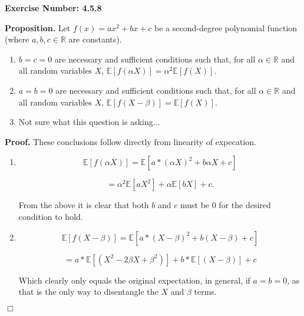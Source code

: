\documentclass{article}
\begin{document}
\noindent \textbf{Exercise Number: 4.5.8}  %

\medskip 

\noindent \textbf{Proposition.} Let $f(x) = ax^2 + bx + c$ be a second-degree polynomial function (where $a,b,c \in \mathbb{R}$ are constants). 

\begin{enumerate}

\item $b = c = 0$ are necessary and sufficient conditions such that, for all $\alpha \in \mathbb{R}$ and all random variables $X$, $\mathbb{E}[f(\alpha X)] = \alpha ^2 \mathbb{E}[f( X)]$. 

\item $a = b = 0$ are necessary and sufficient conditions such that, for all $\alpha \in \mathbb{R}$ and all random variables $X$, $\mathbb{E}[f(X - \beta )] = \mathbb{E}[f(X)]$. 

\item Not sure what this question is asking... 

\end{enumerate}

\bigskip

\noindent \textbf{Proof.} These conclusions follow directly from linearity of expecation. 

\begin{enumerate}

\item \[\mathbb{E}[f(\alpha X)] = \mathbb{E}[a * (\alpha X)^2 + b \alpha X + c] \]

      \[= \alpha^2 \mathbb{E}[a X^2] + \alpha \mathbb{E}[ b X] + c.\]
    
      From the above it is clear that both $b$ and $c$ must be 0 for the desired condition to hold.

\item \[\mathbb{E}[f(X - \beta)] = \mathbb{E}[a * (X - \beta)^2 + b (X - \beta) + c ]\]

      \[= a * \mathbb{E}[(X^2 - 2 \beta X + \beta^2)] + b * \mathbb{E}[ (X - \beta)] + c\]

      Which clearly only equals the original expectation, in general, if $a = b = 0$, as
     that is the only way to disentangle the $X$ and $\beta$ terms. 

\end{enumerate}

\hfill $\Box$
\end{document}
